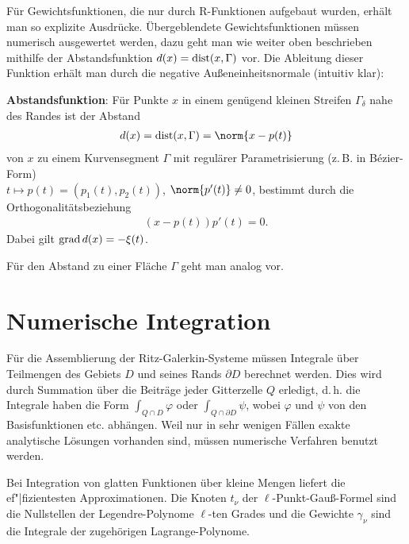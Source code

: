 \linie
\pagebreak

Für Gewichtsfunktionen, die nur durch R-Funktionen aufgebaut wurden, erhält man so explizite
Ausdrücke.
Übergeblendete Gewichtsfunktionen müssen numerisch ausgewertet werden,
dazu geht man wie weiter oben beschrieben mithilfe der Abstandsfunktion $d(x) = \operatorname{dist}(x, \Gamma)$
vor.
Die Ableitung dieser Funktion erhält man durch die negative Außeneinheitsnormale
(intuitiv klar):

\textbf{Abstandsfunktion}:
Für Punkte $x$ in einem genügend kleinen Streifen $\Gamma_\delta$ nahe des Randes ist der Abstand
\begin{align*}
    d(x) = \dist(x, \Gamma) = \norm{x - p(t)}
\end{align*}
von $x$ zu einem Kurvensegment $\Gamma$ mit regulärer Parametrisierung
(z.\,B. in Bézier-Form)\\
$t \mapsto p(t) = (p_1(t), p_2(t))$, $\norm{p'(t)} \not= 0$,
bestimmt durch die Orthogonalitätsbeziehung
\begin{align*}
    (x - p(t)) p'(t) = 0.
\end{align*}
Dabei gilt $\operatorname{grad} d(x) = -\xi(t)$.

Für den Abstand zu einer Fläche $\Gamma$ geht man analog vor.

\section{%
    Numerische Integration%
}

Für die Assemblierung der Ritz-Galerkin-Systeme müssen Integrale über Teilmengen des Gebiets $D$
und seines Rands $\partial D$ berechnet werden.
Dies wird durch Summation über die Beiträge jeder Gitterzelle $Q$ erledigt, d.\,h. die Integrale
haben die Form $\int_{Q \cap D} \varphi$ oder $\int_{Q \cap \partial D} \psi$,
wobei $\varphi$ und $\psi$ von den Basisfunktionen etc. abhängen.
Weil nur in sehr wenigen Fällen exakte analytische Lösungen vorhanden sind, müssen
numerische Verfahren benutzt werden.

Bei Integration von glatten Funktionen über kleine Mengen liefert
 die ef"|fizientesten Approximationen.
Die Knoten $t_\nu$ der $\ell$-Punkt-Gauß-Formel sind die Nullstellen der Legendre-Polynome
$\ell$-ten Grades und die Gewichte $\gamma_\nu$ sind die Integrale der zugehörigen
Lagrange-Polynome.

